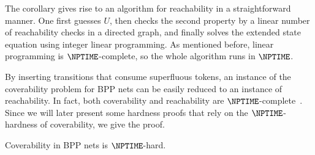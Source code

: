 \documentclass[../../diss.tex]{subfiles}
\begin{document}
The corollary gives rise to an algorithm for reachability in a straightforward manner.
One first guesses $U$, then checks the second property by a linear number of reachability checks in a directed graph, and finally solves the extended state equation using integer linear programming.
As mentioned before, linear programming is $\NPTIME$-complete, so the whole algorithm runs in $\NPTIME$.

By inserting transitions that consume superfluous tokens, an instance of the coverability problem for BPP nets can be easily reduced to an instance of reachability.
In fact, both coverability and reachability are $\NPTIME$-complete~\cite{Esparza97a}.
Since we will later present some hardness proofs that rely on the $\NPTIME$-hardness of coverability, we give the proof.

\begin{lemma}%
\label{Lemma:BPPCOVhardness}%
    Coverability in BPP nets is $\NPTIME$-hard.
\end{lemma}
\end{document}

